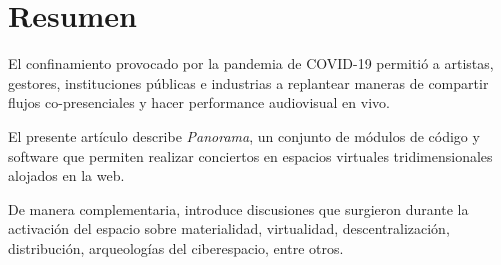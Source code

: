 \section*{Resumen}

El confinamiento provocado por la pandemia de COVID-19 permitió a artistas, gestores, instituciones públicas e industrias a replantear maneras de compartir flujos co-presenciales y hacer performance audiovisual en vivo. %

El presente artículo describe \textit{Panorama}, un conjunto de módulos de código y software que permiten realizar conciertos en espacios virtuales tridimensionales alojados en la web.

De manera complementaria, introduce discusiones que surgieron durante la activación del espacio sobre materialidad, virtualidad, descentralización, distribución, arqueologías del ciberespacio, entre otros.                       
